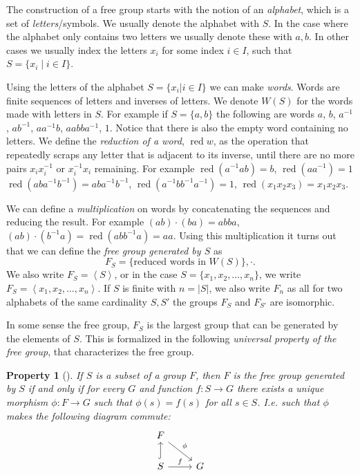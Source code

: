 \documentclass[titlepage, a4paper]{article}
\newcommand{\card}[1]{\left| #1 \right|}
\DeclareMathOperator{\red}{red}
\newtheorem{property}[theorem]{Property}
\theoremstyle{remark}
\begin{document}
The construction of a free group starts with the notion of an \emph{alphabet}, which is a set of \emph{letters}/symbols. We usually denote the alphabet with $S$. In the case where the alphabet only contains two letters we usually denote these with  $a,b$. In other cases we usually index the letters $x_i$ for some index $i \in I$, such that  $S = \{x_i  \mid i \in I\} $.

Using the letters of the alphabet  $S = \{x_i | i \in I\} $ we can make \emph{words}. Words are finite sequences of letters and inverses of letters. We denote $W(S)$ for the words made with letters in $S$. For example if $S = \{a,b\} $ the following are words $a$, $b$, $a^{-1}$, $ab^{-1}$, $aa^{-1}b$, $aabba^{-1}$, $1$. Notice that there is also the empty word containing no letters. 
We define the \emph{reduction of a word}, $\red w$,  as the operation that repeatedly scraps any letter that is adjacent to its inverse, until there are no more pairs $x_ix_i^{-1}$ or  $x_i^{-1}x_i$ remaining. 
For example $\red({a^{-1}ab}) = b$, $\red(a a^{-1}) =1$ $\red(aba^{-1}b^{-1}) = aba^{-1}b^{-1}$, $\red(a^{-1}bb^{-1}a^{-1}) = 1$, $\red(x_1x_2x_3) = x_1x_2x_3$.

We can define a \emph{multiplication} on words by concatenating the sequences and reducing the result. For example $(ab)\cdot (ba) = abba$, $(ab)\cdot(b^{-1}a) = \red(abb^{-1}a) = aa$.
Using this multiplication it turns out that we can define the \emph{free group generated by $S$} as  \[
	F_S = \{\text{reduced words in $W(S)$}\}, \cdot  
.\]
We also write $F_S = \left<S \right>$, or in the case $S = \{x_1, x_2, \ldots, x_n\} $, we write $F_S = \left<x_1, x_2, \ldots, x_n \right>$. If  $S$ is finite with  $n = \card{S}$, we also write  $F_n$ as all for two alphabets of the same cardinality  $S, S'$ the groups $F_S$ and $F_{S'}$ are isomorphic.


In some sense the free group, $F_S$ is the largest group that can be generated by the elements of $S$. This is formalized in the following \emph{universal property of the free group}, that characterizes the free group. 
\begin{property}[{\cite[ch. 5, p. 298]{rotman_advanced_2015}}]
	If  $S$ is a subset of a group  $F$, then $F$ is the free group generated by $S$ if and only if for every $G$ and function $f:S \to G$ there exists a unique morphism $\phi:F \to G$ such that $\phi(s) = f(s)$ for all $s \in S$.
	I.e. such that $\phi$ makes the following diagram commute:
	\[	
	\begin{tikzcd}
		F \arrow[rd, "\phi"]  \\
		S \arrow[u, hook] \arrow[r, "f"] & G
	\end{tikzcd}
\]

\end{property}
\end{document}
